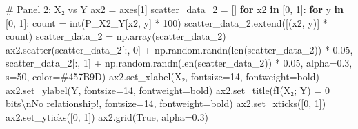 \documentclass[
  11pt,
  letterpaper,
  oneside,
  openany]{book}
\newenvironment{Shaded}{\begin{snugshade}}{\end{snugshade}}
\newcommand{\BuiltInTok}[1]{\textcolor[rgb]{0.00,0.23,0.31}{#1}}
\newcommand{\CharTok}[1]{\textcolor[rgb]{0.13,0.47,0.30}{#1}}
\newcommand{\CommentTok}[1]{\textcolor[rgb]{0.37,0.37,0.37}{#1}}
\newcommand{\ControlFlowTok}[1]{\textcolor[rgb]{0.00,0.23,0.31}{\textbf{#1}}}
\newcommand{\DecValTok}[1]{\textcolor[rgb]{0.68,0.00,0.00}{#1}}
\newcommand{\FloatTok}[1]{\textcolor[rgb]{0.68,0.00,0.00}{#1}}
\newcommand{\KeywordTok}[1]{\textcolor[rgb]{0.00,0.23,0.31}{\textbf{#1}}}
\newcommand{\NormalTok}[1]{\textcolor[rgb]{0.00,0.23,0.31}{#1}}
\newcommand{\OperatorTok}[1]{\textcolor[rgb]{0.37,0.37,0.37}{#1}}
\newcommand{\SpecialStringTok}[1]{\textcolor[rgb]{0.13,0.47,0.30}{#1}}
\newcommand{\StringTok}[1]{\textcolor[rgb]{0.13,0.47,0.30}{#1}}
\newcommand{\VariableTok}[1]{\textcolor[rgb]{0.07,0.07,0.07}{#1}}
\begin{document}
\begin{Shaded}
\begin{Highlighting}[]
\CommentTok{\# Panel 2: X₂ vs Y}
\NormalTok{ax2 }\OperatorTok{=}\NormalTok{ axes[}\DecValTok{1}\NormalTok{]}
\NormalTok{scatter\_data\_2 }\OperatorTok{=}\NormalTok{ []}
\ControlFlowTok{for}\NormalTok{ x2 }\KeywordTok{in}\NormalTok{ [}\DecValTok{0}\NormalTok{, }\DecValTok{1}\NormalTok{]:}
    \ControlFlowTok{for}\NormalTok{ y }\KeywordTok{in}\NormalTok{ [}\DecValTok{0}\NormalTok{, }\DecValTok{1}\NormalTok{]:}
\NormalTok{        count }\OperatorTok{=} \BuiltInTok{int}\NormalTok{(P\_X2\_Y[x2, y] }\OperatorTok{*} \DecValTok{100}\NormalTok{)}
\NormalTok{        scatter\_data\_2.extend([(x2, y)] }\OperatorTok{*}\NormalTok{ count)}
\NormalTok{scatter\_data\_2 }\OperatorTok{=}\NormalTok{ np.array(scatter\_data\_2)}
\NormalTok{ax2.scatter(scatter\_data\_2[:, }\DecValTok{0}\NormalTok{] }\OperatorTok{+}\NormalTok{ np.random.randn(}\BuiltInTok{len}\NormalTok{(scatter\_data\_2)) }\OperatorTok{*} \FloatTok{0.05}\NormalTok{,}
\NormalTok{            scatter\_data\_2[:, }\DecValTok{1}\NormalTok{] }\OperatorTok{+}\NormalTok{ np.random.randn(}\BuiltInTok{len}\NormalTok{(scatter\_data\_2)) }\OperatorTok{*} \FloatTok{0.05}\NormalTok{,}
\NormalTok{            alpha}\OperatorTok{=}\FloatTok{0.3}\NormalTok{, s}\OperatorTok{=}\DecValTok{50}\NormalTok{, color}\OperatorTok{=}\StringTok{\textquotesingle{}\#457B9D\textquotesingle{}}\NormalTok{)}
\NormalTok{ax2.set\_xlabel(}\StringTok{\textquotesingle{}X₂\textquotesingle{}}\NormalTok{, fontsize}\OperatorTok{=}\DecValTok{14}\NormalTok{, fontweight}\OperatorTok{=}\StringTok{\textquotesingle{}bold\textquotesingle{}}\NormalTok{)}
\NormalTok{ax2.set\_ylabel(}\StringTok{\textquotesingle{}Y\textquotesingle{}}\NormalTok{, fontsize}\OperatorTok{=}\DecValTok{14}\NormalTok{, fontweight}\OperatorTok{=}\StringTok{\textquotesingle{}bold\textquotesingle{}}\NormalTok{)}
\NormalTok{ax2.set\_title(}\SpecialStringTok{f\textquotesingle{}I(X₂; Y) = 0 bits}\CharTok{\textbackslash{}n}\SpecialStringTok{No relationship!\textquotesingle{}}\NormalTok{, fontsize}\OperatorTok{=}\DecValTok{14}\NormalTok{, fontweight}\OperatorTok{=}\StringTok{\textquotesingle{}bold\textquotesingle{}}\NormalTok{)}
\NormalTok{ax2.set\_xticks([}\DecValTok{0}\NormalTok{, }\DecValTok{1}\NormalTok{])}
\NormalTok{ax2.set\_yticks([}\DecValTok{0}\NormalTok{, }\DecValTok{1}\NormalTok{])}
\NormalTok{ax2.grid(}\VariableTok{True}\NormalTok{, alpha}\OperatorTok{=}\FloatTok{0.3}\NormalTok{)}


\end{Highlighting}
\end{Shaded}
\end{document}
